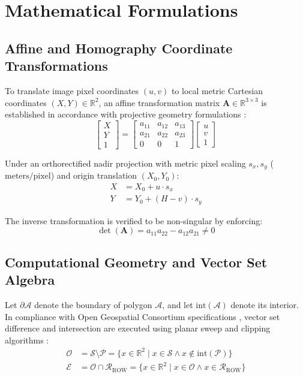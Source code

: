 \documentclass[conference]{IEEEtran}
\begin{document}
\section{Mathematical Formulations}

\subsection{Affine and Homography Coordinate Transformations}
To translate image pixel coordinates $(u, v)$ to local metric Cartesian coordinates $(X, Y) \in \mathbb{R}^2$, an affine transformation matrix $\mathbf{A} \in \mathbb{R}^{3 \times 3}$ is established in accordance with projective geometry formulations \cite{hartley2003multiple}:
\begin{equation}
\begin{bmatrix} X \\ Y \\ 1 \end{bmatrix} = \begin{bmatrix} a_{11} & a_{12} & a_{13} \\ a_{21} & a_{22} & a_{23} \\ 0 & 0 & 1 \end{bmatrix} \begin{bmatrix} u \\ v \\ 1 \end{bmatrix}
\end{equation}

Under an orthorectified nadir projection with metric pixel scaling $s_x, s_y$ ($\text{meters/pixel}$) and origin translation $(X_0, Y_0)$:
\begin{align}
X &= X_0 + u \cdot s_x \\
Y &= Y_0 + (H - v) \cdot s_y
\end{align}

The inverse transformation is verified to be non-singular by enforcing:
\begin{equation}
\det(\mathbf{A}) = a_{11} a_{22} - a_{12} a_{21} \neq 0
\end{equation}

\subsection{Computational Geometry and Vector Set Algebra}
Let $\partial \mathcal{A}$ denote the boundary of polygon $\mathcal{A}$, and let $\text{int}(\mathcal{A})$ denote its interior. In compliance with Open Geospatial Consortium specifications \cite{ogc2011simple}, vector set difference and intersection are executed using planar sweep and clipping algorithms \cite{preparata1985computational, weiler1977hidden}:
\begin{align}
\mathcal{O} &= \mathcal{S} \setminus \mathcal{P} = \{x \in \mathbb{R}^2 \mid x \in \mathcal{S} \land x \notin \text{int}(\mathcal{P})\} \\
\mathcal{E} &= \mathcal{O} \cap \mathcal{R}_{\text{ROW}} = \{x \in \mathbb{R}^2 \mid x \in \mathcal{O} \land x \in \mathcal{R}_{\text{ROW}}\}
\end{align}
\end{document}
